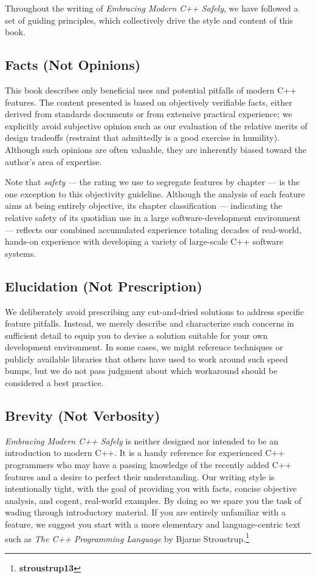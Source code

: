 Throughout the writing of \textit{Embracing Modern C++ Safely}, we have followed a set of guiding principles, which collectively drive the style and content of this book.

\subsection{Facts (Not Opinions)}

This book describes only beneficial uses and potential pitfalls of modern C++ features. The content presented is based on objectively verifiable facts, either derived from standards documents or from extensive practical experience; we explicitly avoid subjective opinion such as our evaluation of the relative merits of design tradeoffs (restraint that admittedly is a good exercise in humility). Although such opinions are often valuable, they are inherently biased toward the author's area of expertise.

Note that \textit{safety} --- the rating we use to segregate features by chapter --- is the one exception to this objectivity guideline. Although the analysis of each feature aims at being entirely objective, its chapter classification --- indicating the relative safety of its quotidian use in a large software-development environment --- reflects our combined accumulated experience totaling decades of real-world, hands-on experience with developing a variety of large-scale C++ software systems.

\subsection{Elucidation (Not Prescription)}

We deliberately avoid prescribing any cut-and-dried solutions to address specific feature pitfalls. Instead, we merely describe and characterize such concerns in sufficient detail to equip you to devise a solution suitable for your own development environment. In some cases, we might reference techniques or publicly available libraries that others have used to work around such speed bumps, but we do not pass judgment about which workaround should be considered a best practice.

\subsection{Brevity (Not Verbosity)}

\textit{Embracing Modern C++ Safely} is neither designed nor intended to be an introduction to modern C++. It is a handy reference for experienced C++ programmers who may have a passing knowledge of the recently added C++ features and a desire to perfect their understanding. Our writing style is intentionally tight, with the goal of providing you with facts, concise objective analysis, and cogent, real-world examples. By doing so we spare you the task of wading through introductory material. If you are entirely unfamiliar with a feature, we suggest you start with a more elementary and language-centric text such as \textit{The C++ Programming Language} by Bjarne Stroustrup.\footnote{\textbf{stroustrup13}}


